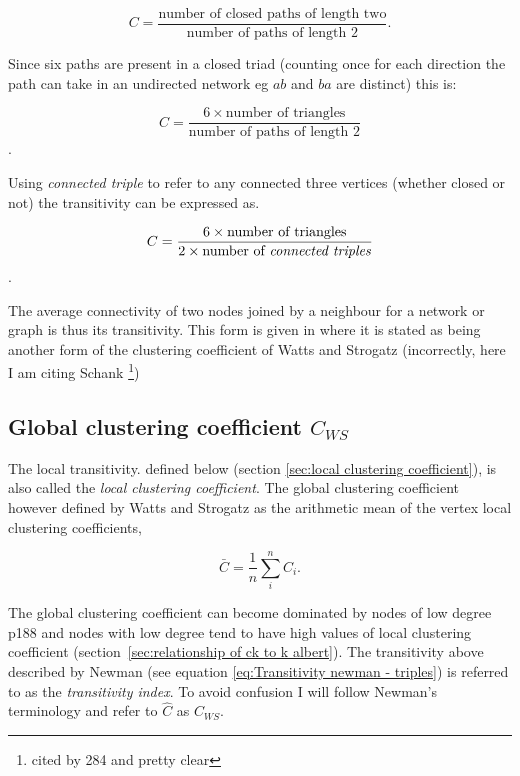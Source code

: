 \begin{equation}
    C = \frac{\textrm{number of closed paths of length two}}{\textrm{number of paths of length 2}}.
    \label{eq:Transitivity newman}
\end{equation}

Since six paths are present in a closed triad (counting once for each direction the path can take in an undirected network eg $ab$ and $ba$ are distinct) this is:

\begin{equation}
    C = \frac{6 \times \textrm{number of triangles}}{\textrm{number of paths of length 2}}
\end{equation}.

Using \textit{connected triple} to refer to any connected three vertices (whether closed or not) the transitivity can be expressed as.

\begin{equation}
    C = \frac{6 \times \textrm{number of triangles}}{2 \times \textrm{number of \textit{connected triples}}}
      \label{eq:Transitivity newman - triples}
\end{equation}.

The average connectivity of two nodes joined by a neighbour for a network or graph is thus its transitivity\cite{newman2001structure}\cite{newman2018networks}. This form is given in \cite{newman2002random} where it is stated as being another form of the clustering coefficient of Watts and Strogatz (incorrectly, here I am citing Schank \cite{schank2005approximating}  \footnote{cited by 284 and pretty clear})



\subsection{Global clustering coefficient $C_{WS}$}
\label{sec:Global clustering coefficient}
The local transitivity. defined below (section \ref{sec:local clustering coefficient}), is also called the \textit{local clustering coefficient}. The global clustering coefficient however defined by Watts and Strogatz\cite{watts1998collective} as the arithmetic mean of the vertex local clustering coefficients\cite{estrada2016local},


\begin{equation}
    \bar{C}=\frac{1}{n}\sum_i^n C_i.
\end{equation}


The global clustering coefficient can become dominated by nodes of low degree\cite{newman2018networks} p188 and nodes with low degree tend to have high values of local clustering coefficient (section~\ref{sec:relationship of ck to k albert}). The transitivity above described by Newman\cite{newman2002random} (see equation \ref{eq:Transitivity newman - triples}) is referred to as the \textit{transitivity index}\cite{estrada2016local}. To avoid confusion I will follow Newman's \cite{newman2018networks} terminology and refer to $\hat{C}$ as $C_{WS}$.

